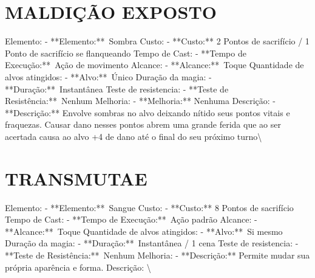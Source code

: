 \documentclass{article}%
\begin{document}
\section{MALDIÇÃO EXPOSTO}%
\label{sec:MALDIOEXPOSTO}%
Elemento: {-} **Elemento:**~Sombra\newline%
Custo: {-} **Custo:** 2 Pontos de sacrifício / 1 Ponto de sacrifício se flanqueando\newline%
Tempo de Cast: {-} **Tempo de Execução:**~Ação de movimento\newline%
Alcance: {-} **Alcance:**~Toque\newline%
Quantidade de alvos atingidos: {-} **Alvo:**~Único\newline%
Duração da magia: {-} **Duração:**~Instantânea\newline%
Teste de resistencia: {-} **Teste de Resistência:**~Nenhum\newline%
Melhoria: {-} **Melhoria:** Nenhuma\newline%
Descrição: {-} **Descrição:** Envolve sombras no alvo deixando nítido seus pontos vitais e fraquezas. Causar dano nesses pontos abrem uma grande ferida que ao ser acertada causa ao alvo +4 de dano até o final do seu próximo turno\textbackslash{}

%
\section{TRANSMUTAE}%
\label{sec:TRANSMUTAE}%
Elemento: {-} **Elemento:**~Sangue\newline%
Custo: {-} **Custo:** 8 Pontos de sacrifício\newline%
Tempo de Cast: {-} **Tempo de Execução:**~Ação padrão\newline%
Alcance: {-} **Alcance:**~Toque\newline%
Quantidade de alvos atingidos: {-} **Alvo:**~Si mesmo\newline%
Duração da magia: {-} **Duração:**~Instantânea / 1 cena\newline%
Teste de resistencia: {-} **Teste de Resistência:**~Nenhum\newline%
Melhoria: {-} **Descrição:** Permite mudar sua própria aparência e forma.\newline%
Descrição: \textbackslash{}

%
\end{document}
